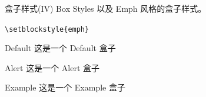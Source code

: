 \documentclass[10pt,aspectratio=169,fontset=none]{ctexbeamer}
\begin{document}
    \begin{frame}{盒子样式(IV) Box Styles}
    以及 Emph 风格的盒子样式。   

        \begin{center}
            \texttt{\textcolor{primary}{\textbackslash setblockstyle}\{emph\}}
        \end{center}

        \centering
        \begin{minipage}[b]{0.5\textwidth}
            \begin{block}{Default}
                这是一个 Default 盒子
            \end{block}
            \begin{alertblock}{Alert}
                这是一个 Alert 盒子
            \end{alertblock}
            \begin{exampleblock}{Example}
                这是一个 Example 盒子
            \end{exampleblock}       
        \end{minipage}
    \end{frame}
\end{document}
